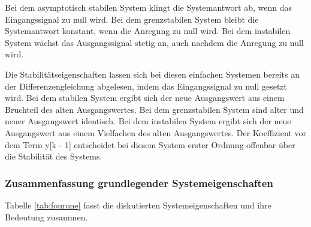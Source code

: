 \noindent Bei dem asymptotisch stabilen System klingt die Systemantwort ab, wenn das Eingangssignal zu null wird. Bei dem grenzstabilen System bleibt die Systemantwort konstant, wenn die Anregung zu null wird. Bei dem instabilen System w\"{a}chst das Ausgangssignal stetig an, auch nachdem die Anregung zu null wird.\medskip

\noindent Die Stabilit\"{a}tseigenschaften lassen sich bei diesen einfachen Systemen bereits an der Differenzengleichung abgelesen, indem das Eingangssignal zu null gesetzt wird. Bei dem stabilen System ergibt sich der neue Ausgangswert aus einem Bruchteil des alten Ausgangswertes. Bei dem grenzstabilen System sind alter und neuer Ausgangswert identisch. Bei dem instabilen System ergibt sich der neue Ausgangswert aus einem Vielfachen des alten Ausgangswertes. Der Koeffizient vor dem Term y[k - 1] entscheidet bei diesem System erster Ordnung offenbar \"{u}ber die Stabilit\"{a}t des Systems.

\clearpage

\subsubsection{Zusammenfassung grundlegender Systemeigenschaften}

\noindent Tabelle \ref{tab:fourone} fasst die diskutierten Systemeigenschaften und ihre Bedeutung zusammen.

